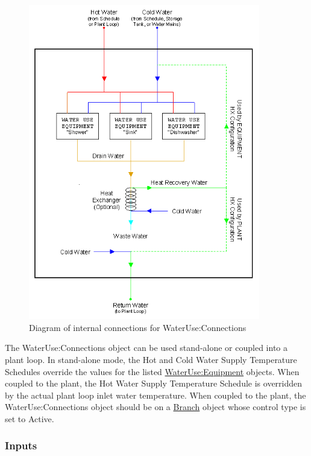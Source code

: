 \begin{figure}[hbtp] %
\centering
\includegraphics[width=0.9\textwidth, height=0.9\textheight, keepaspectratio=true]{media/image579.png}
\caption{Diagram of internal connections for WaterUse:Connections \protect \label{fig:diagram-of-internal-connections-for-wateruse}}
\end{figure}

The WaterUse:Connections object can be used stand-alone or coupled into a plant loop. In stand-alone mode, the Hot and Cold Water Supply Temperature Schedules override the values for the listed \hyperref[wateruseequipment]{WaterUse:Equipment} objects. When coupled to the plant, the Hot Water Supply Temperature Schedule is overridden by the actual plant loop inlet water temperature. When coupled to the plant, the WaterUse:Connections object should be on a \hyperref[branch]{Branch} object whose control type is set to Active.

\subsubsection{Inputs}\label{inputs-1-050}

